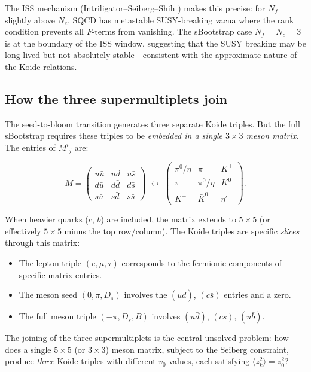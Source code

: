 \documentclass[12pt,a4paper]{article}
\begin{document}
The ISS mechanism (Intriligator--Seiberg--Shih \cite{ISS2006}) makes 
this precise: for $N_f$ slightly above $N_c$, SQCD has metastable 
SUSY-breaking vacua where the rank condition prevents all $F$-terms 
from vanishing. The sBootstrap case $N_f = N_c = 3$ is at the 
boundary of the ISS window, suggesting that the SUSY breaking may 
be long-lived but not absolutely stable---consistent with the 
approximate nature of the Koide relations.

\subsection{How the three supermultiplets join}

The seed-to-bloom transition generates three separate Koide triples. 
But the full sBootstrap requires these triples to be \emph{embedded 
in a single $3\times 3$ meson matrix}. The entries of $M^i{}_j$ are:

\begin{equation}
M = \begin{pmatrix}
u\bar{u} & u\bar{d} & u\bar{s} \\
d\bar{u} & d\bar{d} & d\bar{s} \\
s\bar{u} & s\bar{d} & s\bar{s}
\end{pmatrix}
\;\longleftrightarrow\;
\begin{pmatrix}
\pi^0/\eta & \pi^+ & K^+ \\
\pi^- & \pi^0/\eta & K^0 \\
K^- & \bar{K}^0 & \eta'
\end{pmatrix}.
\end{equation}

When heavier quarks ($c$, $b$) are included, the matrix extends to 
$5\times 5$ (or effectively $5\times 5$ minus the top row/column). 
The Koide triples are specific \emph{slices} through this matrix:

\begin{itemize}
\item The lepton triple $(e, \mu, \tau)$ corresponds to the 
fermionic components of specific matrix entries.
\item The meson seed $(0, \pi, D_s)$ involves the $(u\bar{d})$, 
$(c\bar{s})$ entries and a zero.
\item The full meson triple $(-\pi, D_s, B)$ involves 
$(u\bar{d})$, $(c\bar{s})$, $(u\bar{b})$.
\end{itemize}

The joining of the three supermultiplets is the central unsolved 
problem: how does a single $5\times 5$ (or $3\times 3$) meson 
matrix, subject to the Seiberg constraint, produce \emph{three} 
Koide triples with different $v_0$ values, each satisfying 
$\langle z_k^2\rangle = z_0^2$?
\end{document}
